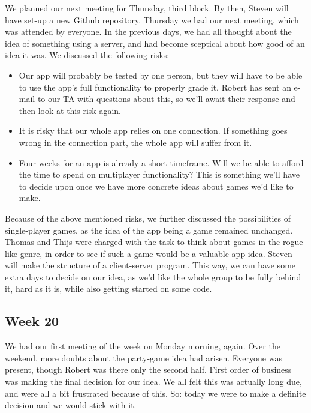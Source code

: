 \documentclass[../main.tex]{subfiles}
\begin{document}
We planned our next meeting for Thursday, third block. By then, Steven will have set-up a new Github repository.
\bigbreak\noindent
Thursday we had our next meeting, which was attended by everyone. In the previous days, we had all thought about the idea of something using a server, and had become sceptical about how good of an idea it was. We discussed the following risks:
\begin{itemize}
	\item Our app will probably be tested by one person, but they will have to be able to use the app's full functionality to properly grade it. Robert has sent an e-mail to our TA with questions about this, so we'll await their response and then look at this risk again.
		\item It is risky that our whole app relies on one connection. If something goes wrong in the connection part, the whole app will suffer from it.
		\item Four weeks for an app is already a short timeframe. Will we be able to afford the time to spend on multiplayer functionality? This is something we'll have to decide upon once we have more concrete ideas about games we'd like to make.
\end{itemize}
Because of the above mentioned risks, we further discussed the possibilities of single-player games, as the idea of the app being a game remained unchanged. Thomas and Thijs were charged with the task to think about games in the rogue-like genre, in order to see if such a game would be a valuable app idea. Steven will make the structure of a client-server program. This way, we can have some extra days to decide on our idea, as we'd like the whole group to be fully behind it, hard as it is, while also getting started on some code.


\subsection*{Week 20}
We had our first meeting of the week on Monday morning, again. Over the weekend, more doubts about the party-game idea had arisen. Everyone was present, though Robert was there only the second half. First order of business was making the final decision for our idea. We all felt this was actually long due, and were all a bit frustrated because of this. So: today we were to make a definite decision and we would stick with it.
\end{document}
